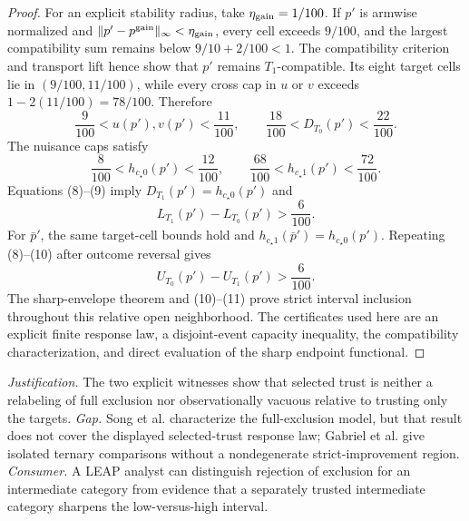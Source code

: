 \documentclass{article}
\begin{document}
\begin{proof}
For an explicit stability radius, take \(\eta_{\rm gain}=1/100\).  If
\(p'\) is armwise normalized and
\(\lVert p'-p^{\rm gain}\rVert_\infty<\eta_{\rm gain}\), every cell exceeds
\(9/100\), and the largest compatibility sum remains below
\(9/10+2/100<1\).  The compatibility criterion and transport lift hence
show that \(p'\) remains \(T_1\)-compatible.  Its eight
target cells lie in \((9/100,11/100)\), while every cross cap in \(u\) or
\(v\) exceeds \(1-2(11/100)=78/100\).  Therefore
\[
 \frac9{100}<u(p'),v(p')<\frac{11}{100},
 \qquad
 \frac{18}{100}<D_{T_0}(p')<\frac{22}{100}. \tag{8}
\]
The nuisance caps satisfy
\[
 \frac8{100}<h_{c_\star0}(p')<\frac{12}{100},
 \qquad
 \frac{68}{100}<h_{c_\star1}(p')<\frac{72}{100}. \tag{9}
\]
Equations (8)--(9) imply \(D_{T_1}(p')=h_{c_\star0}(p')\) and
\[
 L_{T_1}(p')-L_{T_0}(p')>\frac6{100}. \tag{10}
\]
For \(\bar p'\), the same target-cell bounds hold and
\(h_{c_\star1}(\bar p')=h_{c_\star0}(p')\).  Repeating (8)--(10) after
outcome reversal gives
\[
 U_{T_0}(p')-U_{T_1}(p')>\frac6{100}. \tag{11}
\]
The sharp-envelope theorem and (10)--(11) prove strict interval inclusion
throughout this relative open neighborhood.  The certificates used here
are an explicit finite response law, a disjoint-event capacity inequality,
the compatibility characterization, and direct evaluation of the sharp
endpoint functional.
\end{proof}
\par\smallskip\noindent \textit{Justification.} The two explicit witnesses show that selected trust is neither a relabeling of full exclusion nor observationally vacuous relative to trusting only the targets. \textit{Gap.} Song et al. characterize the full-exclusion model, but that result does not cover the displayed selected-trust response law; Gabriel et al. give isolated ternary comparisons without a nondegenerate strict-improvement region. \textit{Consumer.} A LEAP analyst can distinguish rejection of exclusion for an intermediate category from evidence that a separately trusted intermediate category sharpens the low-versus-high interval.
\end{document}
